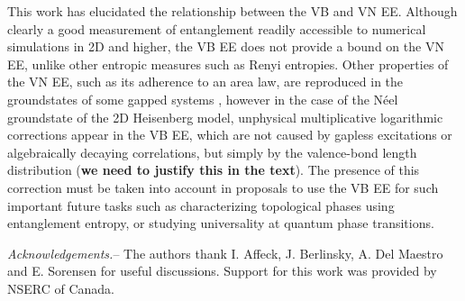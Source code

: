 \documentclass[prl,aps,twocolumn,floatfix,amsmath,amssymb,superscriptaddress,tightenlines]{revtex4}
\begin{document}
This work has elucidated the relationship between the VB and VN EE.
Although clearly a good measurement of entanglement readily accessible to
numerical simulations in 2D and higher, the VB EE does not provide a bound
on the VN EE, unlike other entropic measures such as Renyi entropies.
Other properties of the VN EE, such as its adherence to an area law, are
reproduced in the groundstates of some gapped systems \cite{Alet,Chh},
however in the case of the N\'eel groundstate of the 2D Heisenberg model,
unphysical multiplicative logarithmic corrections appear in the VB EE,
which are not caused by gapless excitations or algebraically decaying
correlations, but simply by the valence-bond length distribution ({\bf we
need to justify this in the text}).  The presence of this correction must
be taken into account in proposals to use the VB EE for such important
future tasks such as characterizing topological phases using entanglement
entropy, or studying universality at quantum phase transitions.

{\it Acknowledgements.}-- The authors thank I. Affeck, J. Berlinsky, A.
Del Maestro and E. Sorensen for useful discussions.  Support for this work
was provided by NSERC of Canada.



\end{document}
